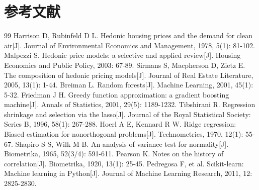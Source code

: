 \documentclass[12pt,a4paper]{ctexart}
\begin{document}
\section{参考文献}
\begin{thebibliography}{99}
 Harrison D, Rubinfeld D L. Hedonic housing prices and the demand for clean air[J]. Journal of Environmental Economics and Management, 1978, 5(1): 81-102.
 Malpezzi S. Hedonic price models: a selective and applied review[J]. Housing Economics and Public Policy, 2003: 67-89.
 Sirmans S, Macpherson D, Zietz E. The composition of hedonic pricing models[J]. Journal of Real Estate Literature, 2005, 13(1): 1-44.
 Breiman L. Random forests[J]. Machine Learning, 2001, 45(1): 5-32.
 Friedman J H. Greedy function approximation: a gradient boosting machine[J]. Annals of Statistics, 2001, 29(5): 1189-1232.
 Tibshirani R. Regression shrinkage and selection via the lasso[J]. Journal of the Royal Statistical Society: Series B, 1996, 58(1): 267-288.
 Hoerl A E, Kennard R W. Ridge regression: Biased estimation for nonorthogonal problems[J]. Technometrics, 1970, 12(1): 55-67.
 Shapiro S S, Wilk M B. An analysis of variance test for normality[J]. Biometrika, 1965, 52(3/4): 591-611.
 Pearson K. Notes on the history of correlation[J]. Biometrika, 1920, 13(1): 25-45.
 Pedregosa F, et al. Scikit-learn: Machine learning in Python[J]. Journal of Machine Learning Research, 2011, 12: 2825-2830.
\end{thebibliography}
\end{document}
